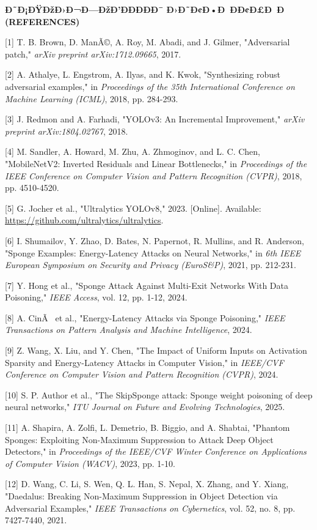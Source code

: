 \documentclass[]{article}
\begin{document}
\textbf{\hfill\break
Ð˜Ð¡ÐŸÐžÐ›Ð¬Ð—ÐžÐ’ÐÐÐÐÐ¯ Ð›Ð˜Ð¢Ð•Ð ÐÐ¢Ð£Ð Ð (REFERENCES)}

{[}1{]} T. B. Brown, D. ManÃ©, A. Roy, M. Abadi, and J. Gilmer, "Adversarial patch," \emph{arXiv preprint arXiv:1712.09665}, 2017.

{[}2{]} A. Athalye, L. Engstrom, A. Ilyas, and K. Kwok, "Synthesizing robust adversarial examples," in \emph{Proceedings of the 35th International Conference on Machine Learning (ICML)}, 2018, pp. 284-293.

{[}3{]} J. Redmon and A. Farhadi, "YOLOv3: An Incremental Improvement," \emph{arXiv preprint arXiv:1804.02767}, 2018.

{[}4{]} M. Sandler, A. Howard, M. Zhu, A. Zhmoginov, and L. C. Chen, "MobileNetV2: Inverted Residuals and Linear Bottlenecks," in \emph{Proceedings of the IEEE Conference on Computer Vision and Pattern Recognition (CVPR)}, 2018, pp. 4510-4520.

{[}5{]} G. Jocher et al., "Ultralytics YOLOv8," 2023. {[}Online{]}. Available: \url{https://github.com/ultralytics/ultralytics}.

{[}6{]} I. Shumailov, Y. Zhao, D. Bates, N. Papernot, R. Mullins, and R. Anderson, "Sponge Examples: Energy-Latency Attacks on Neural Networks," in \emph{6th IEEE European Symposium on Security and Privacy (EuroS\&P)}, 2021, pp. 212-231.

{[}7{]} Y. Hong et al., "Sponge Attack Against Multi-Exit Networks With Data Poisoning," \emph{IEEE Access}, vol. 12, pp. 1-12, 2024.

{[}8{]} A. CinÃ  et al., "Energy-Latency Attacks via Sponge Poisoning," \emph{IEEE Transactions on Pattern Analysis and Machine Intelligence}, 2024.

{[}9{]} Z. Wang, X. Liu, and Y. Chen, "The Impact of Uniform Inputs on Activation Sparsity and Energy-Latency Attacks in Computer Vision," in \emph{IEEE/CVF Conference on Computer Vision and Pattern Recognition (CVPR)}, 2024.

{[}10{]} S. P. Author et al., "The SkipSponge attack: Sponge weight poisoning of deep neural networks," \emph{ITU Journal on Future and Evolving Technologies}, 2025.

{[}11{]} A. Shapira, A. Zolfi, L. Demetrio, B. Biggio, and A. Shabtai, "Phantom Sponges: Exploiting Non-Maximum Suppression to Attack Deep Object Detectors," in \emph{Proceedings of the IEEE/CVF Winter Conference on Applications of Computer Vision (WACV)}, 2023, pp. 1-10.

{[}12{]} D. Wang, C. Li, S. Wen, Q. L. Han, S. Nepal, X. Zhang, and Y. Xiang, "Daedalus: Breaking Non-Maximum Suppression in Object Detection via Adversarial Examples," \emph{IEEE Transactions on Cybernetics}, vol. 52, no. 8, pp. 7427-7440, 2021.
\end{document}
